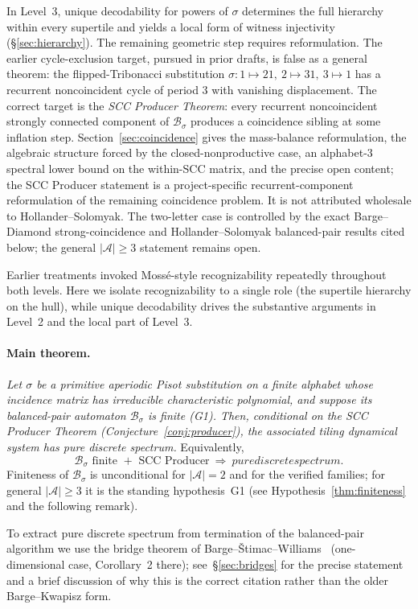 \documentclass[11pt]{article}
\theoremstyle{plain}
\theoremstyle{definition}
\theoremstyle{remark}
\newcommand{\PDS}{pure discrete spectrum}
\newcommand{\A}{\mathcal{A}}
\newcommand{\B}{\mathcal{B}}
\begin{document}
In Level~3, unique decodability for powers of $\sigma$ determines the full hierarchy within every supertile and yields a local form of witness injectivity (\S\ref{sec:hierarchy}). The remaining geometric step requires reformulation. The earlier cycle-exclusion target, pursued in prior drafts, is false as a general theorem: the flipped-Tribonacci substitution $\sigma:1\mapsto 21,\ 2\mapsto 31,\ 3\mapsto 1$ has a recurrent noncoincident cycle of period 3 with vanishing displacement. The correct target is the \emph{SCC Producer Theorem}: every recurrent noncoincident strongly connected component of $\B_\sigma$ produces a coincidence sibling at some inflation step. Section~\ref{sec:coincidence} gives the mass-balance reformulation, the algebraic structure forced by the closed-nonproductive case, an alphabet-$3$ spectral lower bound on the within-SCC matrix, and the precise open content; the SCC Producer statement is a project-specific recurrent-component reformulation of the remaining coincidence problem. It is not attributed wholesale to Hollander--Solomyak. The two-letter case is controlled by the exact Barge--Diamond strong-coincidence and Hollander--Solomyak balanced-pair results cited below; the general $|\A|\ge 3$ statement remains open.

Earlier treatments invoked Moss\'e-style recognizability repeatedly throughout both levels. Here we isolate recognizability to a single role (the supertile hierarchy on the hull), while unique decodability drives the substantive arguments in Level~2 and the local part of Level~3.

\paragraph{Main theorem.} \emph{Let $\sigma$ be a primitive aperiodic Pisot substitution on a finite alphabet whose incidence matrix has irreducible characteristic polynomial, and suppose its balanced-pair automaton $\B_\sigma$ is finite \textup{(G1)}. Then, conditional on the SCC Producer Theorem (Conjecture~\ref{conj:producer}), the associated tiling dynamical system has \PDS.} Equivalently,
\[
\boxed{\;\B_\sigma\text{ finite }+\text{ SCC Producer}\ \Longrightarrow\ \PDS.\;}
\]
Finiteness of $\B_\sigma$ is unconditional for $|\A|=2$ and for the verified families; for general $|\A|\ge3$ it is the standing hypothesis~G1 (see Hypothesis~\ref{thm:finiteness} and the following remark).

To extract \PDS{} from termination of the balanced-pair algorithm we use the bridge theorem of Barge--\v{S}timac--Williams~\cite{BSW} (one-dimensional case, Corollary~2 there); see~\S\ref{sec:bridges} for the precise statement and a brief discussion of why this is the correct citation rather than the older Barge--Kwapisz form.
\end{document}
